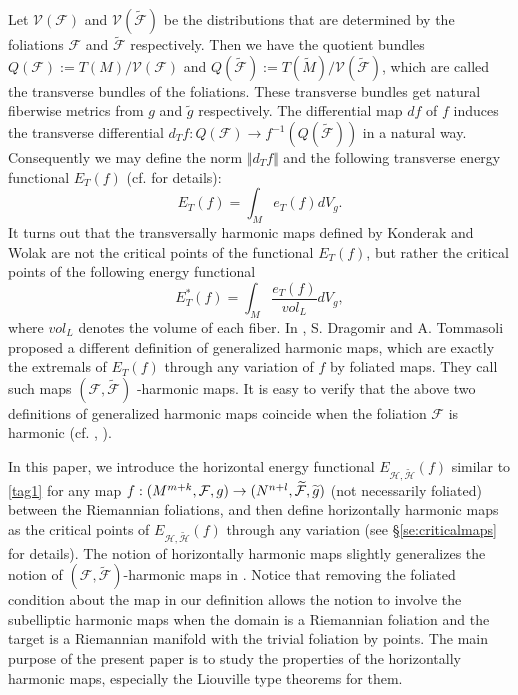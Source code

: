 \documentclass[12pt,reqno]{amsart}
\theoremstyle{definition}
\begin{document}
	Let $\mathcal{V}(\mathcal{F})$ and $\mathcal{V}(\widetilde{\mathcal{F}})$ be
	the distributions that are determined by the foliations $\mathcal{F}$ and $%
	\widetilde{\mathcal{F}}$ respectively. Then we have the quotient bundles $Q(%
	\mathcal{F}):=T(M)/\mathcal{V}(\mathcal{F})$ and $Q(\widetilde{\mathcal{F}}%
	):=T(\widetilde{M})/\mathcal{V}(\widetilde{\mathcal{F}})$, which are called
	the transverse bundles of the foliations. These transverse bundles get
	natural fiberwise metrics from $g$ and $\widetilde{g}$ respectively. The
	differential map $df$ of $f$ induces the transverse differential $d_{T}f:Q(%
	\mathcal{F})\rightarrow f^{-1}(Q(\widetilde{\mathcal{F}}))$ in a natural
	way. Consequently we may define the norm $\Vert d_{T}f\Vert $ and the
	following transverse energy functional $E_{T}(f)$ (cf. \cite{dragomirHarmonicMapsFoliated2013a} for details): 
	\begin{equation}\label{tag1}
	E_{T}(f)=\int_{M}e_{T}(f)dV_{g}.  
	\end{equation}%
	It turns out that the transversally harmonic maps defined by Konderak and
	Wolak are not the critical points of the functional $E_{T}(f)$, but rather
	the critical points of the following energy functional%
	\begin{equation}\label{tag2}
	E_{T}^{\ast }(f)=\int_{M}\frac{e_{T}(f)}{vol_{L}}dV_{g} , \tag{2}
	\end{equation}%
	where $vol_{L}$ denotes the volume of each fiber. In \cite{dragomirHarmonicMapsFoliated2013a}, S. Dragomir and
	A. Tommasoli proposed a different definition of generalized harmonic maps,
	which are exactly the extremals of $E_{T}(f)$ through any variation of $f$
	by foliated maps. They call such maps $(\mathcal{F},\widetilde{\mathcal{F}})$%
	-harmonic maps. It is easy to verify that the above two definitions of
	generalized harmonic maps coincide when the foliation $\mathcal{F}$ is
	harmonic (cf. \cite{chenBochnertypeFormulasTransversally2012a}, \cite{dragomirHarmonicMapsFoliated2013a}).
	
	In this paper, we introduce the horizontal energy functional $E_{\mathcal{H},%
	\widetilde{\mathcal{H}}}(f)$ similar to \eqref{tag1} for any map $f:(M^{m+k},\mathcal{%
	F},g)\rightarrow (N^{n+l},\widetilde{\mathcal{F}},\widetilde{g})$ (not
	necessarily foliated) between the Riemannian foliations, and then define
	horizontally harmonic maps as the critical points of $E_{\mathcal{H},%
	\widetilde{\mathcal{H}}}(f)$ through any variation (see \S \ref{se:criticalmaps} for details).
	The notion of horizontally harmonic maps slightly generalizes the notion of $%
	(\mathcal{F},\widetilde{\mathcal{F}})$-harmonic maps in \cite{dragomirHarmonicMapsFoliated2013a}. Notice that
	removing the foliated condition about the map in our definition allows the
	notion to involve the subelliptic harmonic maps when the domain is a
	Riemannian foliation and the target is a Riemannian manifold with the
	trivial foliation by points. The main purpose of the present paper is to
	study the properties of the horizontally harmonic maps, especially the
	Liouville type theorems for them.
	
\end{document}
